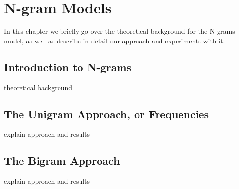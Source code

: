 \chapter{N-gram Models}
\label{chap:N-gram Models}

In this chapter we briefly go over the theoretical background for the N-grams model,
as well as describe in detail our approach and experiments with it.
\section{Introduction to N-grams}
theoretical background

\section{The Unigram Approach, or Frequencies}
explain approach and results

\section{The Bigram Approach}
explain approach and results
